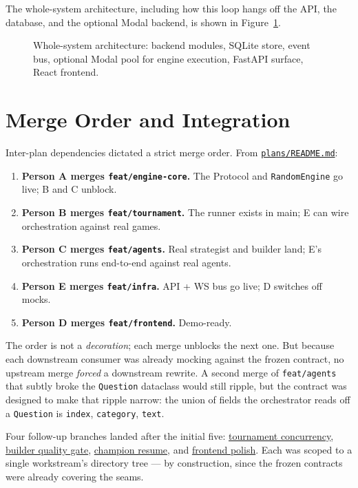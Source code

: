 \documentclass[11pt]{article}
\begin{document}
The whole-system architecture, including how this loop hangs off the
API, the database, and the optional Modal backend, is shown in
Figure~\ref{fig:meta-architecture}.

\begin{figure}[h!]
\centering

\caption{Whole-system architecture: backend modules, SQLite store,
event bus, optional Modal pool for engine execution, FastAPI surface,
React frontend.}
\label{fig:meta-architecture}
\end{figure}

\section{Merge Order and Integration}
\label{sec:merge-order}

Inter-plan dependencies dictated a strict merge order. From
\href{run:../plans/README.md}{\texttt{plans/README.md}}:

\begin{enumerate}[leftmargin=*]
\item \textbf{Person A merges \texttt{feat/engine-core}.} The Protocol
and \texttt{RandomEngine} go live; B and C unblock.
\item \textbf{Person B merges \texttt{feat/tournament}.} The runner
exists in main; E can wire orchestration against real games.
\item \textbf{Person C merges \texttt{feat/agents}.} Real strategist
and builder land; E's orchestration runs end-to-end against real
agents.
\item \textbf{Person E merges \texttt{feat/infra}.} API + WS bus go
live; D switches off mocks.
\item \textbf{Person D merges \texttt{feat/frontend}.} Demo-ready.
\end{enumerate}

The order is not a \emph{decoration}; each merge unblocks the next
one. But because each downstream consumer was already mocking against
the frozen contract, no upstream merge \emph{forced} a downstream
rewrite. A second merge of \texttt{feat/agents} that subtly broke the
\texttt{Question} dataclass would still ripple, but the contract was
designed to make that ripple narrow: the union of fields the
orchestrator reads off a \texttt{Question} is \texttt{index},
\texttt{category}, \texttt{text}.

Four follow-up branches landed after the initial five:
\href{run:../plans/followup-1-tournament-concurrency.md}{tournament
concurrency},
\href{run:../plans/followup-2-builder-quality.md}{builder quality
gate},
\href{run:../plans/followup-3-champion-resume.md}{champion resume},
and
\href{run:../plans/followup-4-frontend-polish.md}{frontend polish}.
Each was scoped to a single workstream's directory tree --- by
construction, since the frozen contracts were already covering the
seams.
\end{document}

